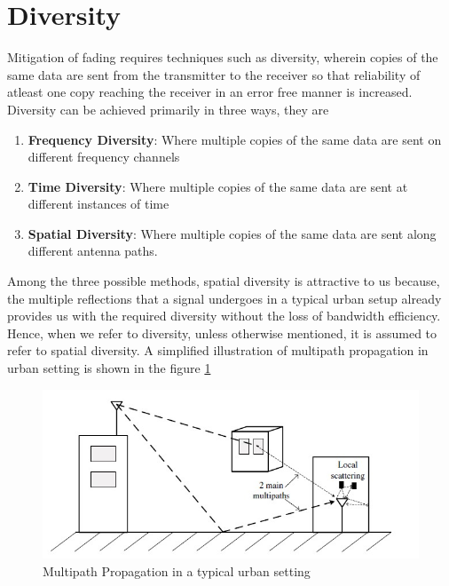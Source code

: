 \section{Diversity}
Mitigation of fading requires techniques such as diversity, wherein copies of the same data are sent from the transmitter to the receiver so that reliability of atleast one copy reaching the receiver in an error free manner is increased.\\
Diversity can be achieved primarily in three ways, they are
\begin{enumerate}
\item \textbf{Frequency Diversity}: Where multiple copies of the same data are sent on different frequency channels
\item \textbf{Time Diversity}: Where multiple copies of the same data are sent at different instances of time
\item \textbf{Spatial Diversity}: Where multiple copies of the same data are sent along different antenna paths.
\end{enumerate}
Among the three possible methods, \gls{spatial diversity} is attractive to us because, the multiple reflections that a signal undergoes in a typical urban setup already provides us with the required diversity without the loss of bandwidth efficiency. Hence, when we refer to diversity, unless otherwise mentioned, it is assumed to refer to \gls{spatial diversity}. A simplified illustration of multipath propagation in urban setting is shown in the figure \ref{fig:multipath propagation}\\
\begin{figure}[!htbp]
\centering
\includegraphics[scale=1]{Chapter 2/Figures/Multipath Propagation}
\caption{Multipath Propagation in a typical urban setting}
\label{fig:multipath propagation}
\end{figure}
